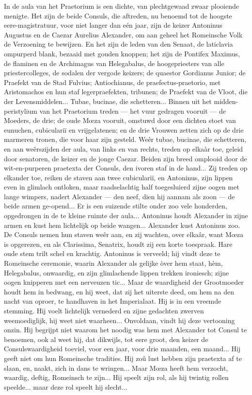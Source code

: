 \documentclass[a4paper, 12pt, oneside, dutch]{article}
\begin{document}
In de aula van het Praetorium is een dichte, van plechtgewaad zwaar plooiende menigte. Het zijn de beide Consuls, die aftreden, nu benoemd tot de hoogste eere-magistratuur, voor niet langer dan eén jaar, zijn de keizer Antoninus Augustus en de Caezar Aurelius Alexander, om aan geheel het Romeinsche Volk de Verzoening te bewijzen. En het zijn de leden van den Senaat, de laticlavia ompurperd blank, bezaaid met gouden knoppen; het zijn de Pontifex Maximus, de flaminen en de Archimagus van Helegabalus, de hoogepriesters van alle priestercolleges, de sodalen der vergode keizers; de quaestor Gordianus Junior; de Praefekt van de Stad Fulvius; Antiochianus, de praefectus-praetorio, met Aristomachos en hun staf legerpraefekten, tribunen; de Praefekt van de Vloot, die der Levensmiddelen... Tubae, bucinae, die schetteren... Binnen uit het midden-peristylium van het Praetorium treden --- het vuur gedragen vooruit --- de Moeders, de drie; de oude Mœza vooruit, omstuwd door een dichten stoet van eunuchen, cubiculariï en vrijgelatenen; en de drie Vrouwen zetten zich op de drie marmeren tronen, die voor haar zijn gesteld. Weêr tubae, bucinae, die schetteren, en aan weêrszijden der aula, van links en van rechts, treden op elkaàr toe, geleid door senatoren, de keizer en de jonge Caezar. Beiden zijn breed omplooid door de wit-en-purperen praetexta der Consuls, den ivoren staf in de hand... Zij treden op elkander toe, reiken de staven aan twee cubiculariï, en Antoninus, zijn lippen even in glimlach ontloken, maar raadselachtig half toegesluierd zijne oogen met lange wimpers, nadert Alexander --- den neef, dien hij aannam als zoon --- de beide armen ge-opend... Er is een suizende stilte onder zoo vele honderden, opgedrongen in de te kleine ruimte der aula... Antoninus houdt Alexander in zijne armen en kust hem lichtelijk op beide wangen... Alexander kust Antoninus zoo. De Consuls nemen hun staven weêr aan, en zij wachten, over elkaâr, want Mœza is opgerezen, en als Clarissima, Senatrix, houdt zij een korte toespraak. Hare oude stem trilt schel en krachtig. Antoninus is verveeld; hij vindt deze te Romeinsche ceremonie, waarin Alexander als gelijke òver hem staat, hèm, Helegabalus, onwaardig, en zijn glimlachende lippen trekken ironiesch; zijne oogen knipperen met een nerveuzen tic... Maar de waardigheid der Grootmoeder houdt hem in bedwang, en hij weet, dat zij het uiterste deed, om hem na den nacht van oproer, te handhaven in het Imperialaat. Hij is in een vreemde stemming. Hij voelt lichtelijk vernederd en zijne gedachten zwerven weemoediglijk, hij weet niet waarheen... Onvoldaan, vindt hij deze vertooning onzin. Hij begrijpt niet waarom het noodig was hem met Alexander tot Consul te benoemen, ook al weet hij, dat dikwijls, tot eere groot, den keizer de Consulswaardigheid toeviel, voor een jaar, voor drie maanden, een maand... Hij geeft niet om hun Romeinsche tradities. Hij zoû lust hebben zijn praetexta af te slaan, en, naakt, zich in dans te wringen... Maar Mœza heeft hem verzocht, waardig, deftig, Romeinsch te zijn... Hij speelt zijn rol, als hij twintig rollen speelde... maar deze rol speelt hij slecht...
\end{document}
